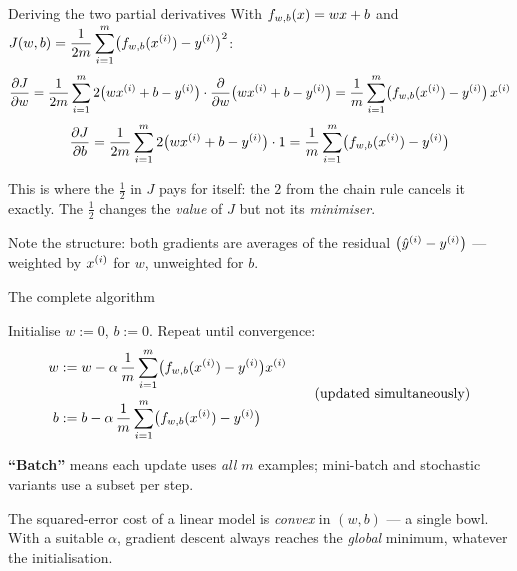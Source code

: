 \documentclass[aspectratio=169,10pt]{beamer}
\begin{document}
\begin{frame}{Deriving the two partial derivatives}
  \small
  With $f_{w,b}(x)=wx+b$ and $J(w,b)=\dfrac{1}{2m}\displaystyle\sum_{i=1}^{m}\bigl(f_{w,b}(x^{(i)})-y^{(i)}\bigr)^2$:
  \vspace{1mm}
  \[
    \frac{\partial J}{\partial w}
    = \frac{1}{2m}\sum_{i=1}^{m} 2\bigl(wx^{(i)}+b-y^{(i)}\bigr)\cdot \frac{\partial}{\partial w}\bigl(wx^{(i)}+b-y^{(i)}\bigr)
    = \frac{1}{m}\sum_{i=1}^{m}\bigl(f_{w,b}(x^{(i)})-y^{(i)}\bigr)\,x^{(i)}
  \]
  \[
    \frac{\partial J}{\partial b}
    = \frac{1}{2m}\sum_{i=1}^{m} 2\bigl(wx^{(i)}+b-y^{(i)}\bigr)\cdot 1
    = \frac{1}{m}\sum_{i=1}^{m}\bigl(f_{w,b}(x^{(i)})-y^{(i)}\bigr)
  \]
  \vspace{1mm}
  \begin{keyidea}
    This is where the $\tfrac{1}{2}$ in $J$ pays for itself: the $2$ from the
    chain rule cancels it exactly. The $\tfrac12$ changes the \emph{value} of $J$
    but not its \emph{minimiser}.
  \end{keyidea}
  \vspace{1mm}
  Note the structure: both gradients are averages of the residual
  $\bigl(\hat{y}^{(i)}-y^{(i)}\bigr)$ --- weighted by $x^{(i)}$ for $w$, unweighted for $b$.
\end{frame}

\begin{frame}{The complete algorithm}
  \begin{defnbox}
    Initialise $w:=0$, $b:=0$. Repeat until convergence:
    \[
      \begin{aligned}
        w &:= w - \alpha\,\frac{1}{m}\sum_{i=1}^{m}\bigl(f_{w,b}(x^{(i)})-y^{(i)}\bigr)x^{(i)}\\[3pt]
        b &:= b - \alpha\,\frac{1}{m}\sum_{i=1}^{m}\bigl(f_{w,b}(x^{(i)})-y^{(i)}\bigr)
      \end{aligned}
      \qquad\text{(updated simultaneously)}
    \]
  \end{defnbox}
  \small
  \textbf{``Batch''} means each update uses \emph{all $m$} examples; mini-batch
  and stochastic variants use a subset per step.
  \begin{keyidea}
    \footnotesize The squared-error cost of a linear model is \emph{convex} in
    $(w,b)$ --- a single bowl. With a suitable $\alpha$, gradient descent
    always reaches the \emph{global} minimum, whatever the initialisation.
  \end{keyidea}
\end{frame}
\end{document}
